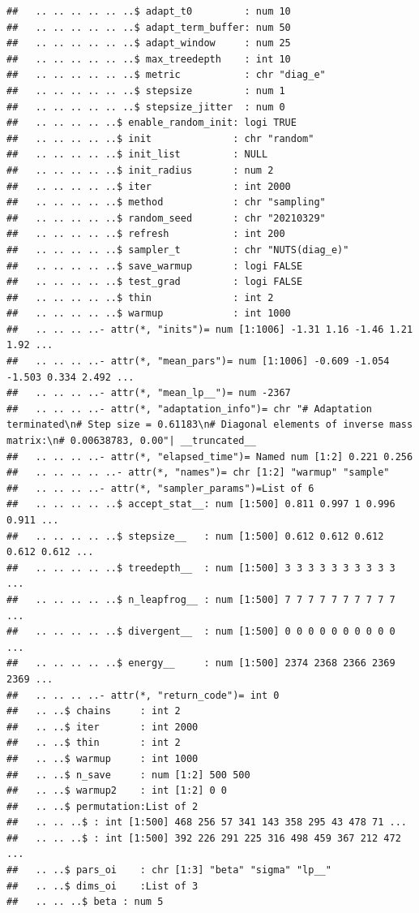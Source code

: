 \documentclass[
  11pt,
]{article}
\begin{document}
\begin{verbatim}
##   .. .. .. .. .. ..$ adapt_t0         : num 10
##   .. .. .. .. .. ..$ adapt_term_buffer: num 50
##   .. .. .. .. .. ..$ adapt_window     : num 25
##   .. .. .. .. .. ..$ max_treedepth    : int 10
##   .. .. .. .. .. ..$ metric           : chr "diag_e"
##   .. .. .. .. .. ..$ stepsize         : num 1
##   .. .. .. .. .. ..$ stepsize_jitter  : num 0
##   .. .. .. .. ..$ enable_random_init: logi TRUE
##   .. .. .. .. ..$ init              : chr "random"
##   .. .. .. .. ..$ init_list         : NULL
##   .. .. .. .. ..$ init_radius       : num 2
##   .. .. .. .. ..$ iter              : int 2000
##   .. .. .. .. ..$ method            : chr "sampling"
##   .. .. .. .. ..$ random_seed       : chr "20210329"
##   .. .. .. .. ..$ refresh           : int 200
##   .. .. .. .. ..$ sampler_t         : chr "NUTS(diag_e)"
##   .. .. .. .. ..$ save_warmup       : logi FALSE
##   .. .. .. .. ..$ test_grad         : logi FALSE
##   .. .. .. .. ..$ thin              : int 2
##   .. .. .. .. ..$ warmup            : int 1000
##   .. .. .. ..- attr(*, "inits")= num [1:1006] -1.31 1.16 -1.46 1.21 1.92 ...
##   .. .. .. ..- attr(*, "mean_pars")= num [1:1006] -0.609 -1.054 -1.503 0.334 2.492 ...
##   .. .. .. ..- attr(*, "mean_lp__")= num -2367
##   .. .. .. ..- attr(*, "adaptation_info")= chr "# Adaptation terminated\n# Step size = 0.61183\n# Diagonal elements of inverse mass matrix:\n# 0.00638783, 0.00"| __truncated__
##   .. .. .. ..- attr(*, "elapsed_time")= Named num [1:2] 0.221 0.256
##   .. .. .. .. ..- attr(*, "names")= chr [1:2] "warmup" "sample"
##   .. .. .. ..- attr(*, "sampler_params")=List of 6
##   .. .. .. .. ..$ accept_stat__: num [1:500] 0.811 0.997 1 0.996 0.911 ...
##   .. .. .. .. ..$ stepsize__   : num [1:500] 0.612 0.612 0.612 0.612 0.612 ...
##   .. .. .. .. ..$ treedepth__  : num [1:500] 3 3 3 3 3 3 3 3 3 3 ...
##   .. .. .. .. ..$ n_leapfrog__ : num [1:500] 7 7 7 7 7 7 7 7 7 7 ...
##   .. .. .. .. ..$ divergent__  : num [1:500] 0 0 0 0 0 0 0 0 0 0 ...
##   .. .. .. .. ..$ energy__     : num [1:500] 2374 2368 2366 2369 2369 ...
##   .. .. .. ..- attr(*, "return_code")= int 0
##   .. ..$ chains     : int 2
##   .. ..$ iter       : int 2000
##   .. ..$ thin       : int 2
##   .. ..$ warmup     : int 1000
##   .. ..$ n_save     : num [1:2] 500 500
##   .. ..$ warmup2    : int [1:2] 0 0
##   .. ..$ permutation:List of 2
##   .. .. ..$ : int [1:500] 468 256 57 341 143 358 295 43 478 71 ...
##   .. .. ..$ : int [1:500] 392 226 291 225 316 498 459 367 212 472 ...
##   .. ..$ pars_oi    : chr [1:3] "beta" "sigma" "lp__"
##   .. ..$ dims_oi    :List of 3
##   .. .. ..$ beta : num 5

\end{verbatim}
\end{document}
